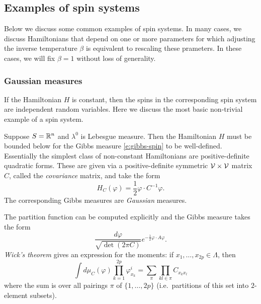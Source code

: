 \subsection{Examples of spin systems}

Below we discuss some common examples of spin systems.
In many cases, we discuss Hamiltonians that depend on one or more parameters
for which adjusting the inverse temperature $\beta$ is equivalent to rescaling
these prameters. In these cases, we will fix $\beta = 1$ without loss of
generality.

\subsubsection{Gaussian measures}

If the Hamiltonian $H$ is constant, then the spins in the corresponding spin system
are independent random variables. Here we discuss the most basic non-trivial example
of a spin system.

Suppose $S = {\mathbb R}^n$ and $\lambda^0$ is Lebesgue measure. Then the Hamiltonian
$H$ must be bounded below for the Gibbs measure \eqref{e:gibbs-spin} to be
well-defined. Essentially the simplest class of non-constant Hamiltonians
are positive-definite quadratic forms. These are given via a positive-definite
symmetric $\mathcal{V}\times\mathcal{V}$ matrix $C$, called the \emph{covariance}
matrix, and take the form
\begin{equation}
H_C(\varphi) = \frac{1}{2} \varphi \cdot C^{-1} \varphi.
\end{equation}
The corresponding Gibbs measures are \emph{Gaussian} measures.

The partition function can be computed explicitly and the Gibbs measure takes
the form
\begin{equation}
\label{e:gauss-density}
\frac{d\varphi}{\sqrt{\det(2\pi C)}}
e^{-\tfrac12 \varphi \cdot A \varphi}.
\end{equation}
\emph{Wick's theorem} gives an expression for the moments:
if $x_1, \ldots, x_{2p} \in \Lambda$, then
\begin{equation}
\label{e:wick}
\int d\mu_C(\varphi) \prod_{k=1}^{2p} \varphi^i_{x_k}
	=
\sum_\pi \prod_{kl\in\pi} C_{x_kx_l}
\end{equation}
where the sum is over all pairings $\pi$ of $\{1,\ldots,2p\}$ (i.e.\ partitions of
this set into $2$-element subsets).


